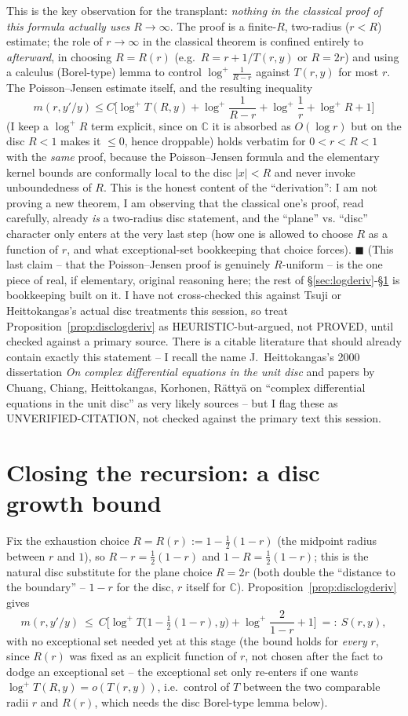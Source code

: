 \documentclass[11pt]{article}
\theoremstyle{remark}
\newcommand{\C}{\mathbb C}
\begin{document}
This is the key observation for the transplant: \emph{nothing in the classical proof of this
formula actually uses $R\to\infty$}. The proof is a finite-$R$, two-radius ($r<R$) estimate; the
role of $r\to\infty$ in the classical theorem is confined entirely to \emph{afterward}, in choosing
$R=R(r)$ (e.g.\ $R=r+1/T(r,y)$ or $R=2r$) and using a calculus (Borel-type) lemma to control
$\log^+\frac1{R-r}$ against $T(r,y)$ for most $r$. The Poisson--Jensen estimate itself, and the
resulting inequality
\[
m(r,y'/y)\le C\Big[\log^+T(R,y)+\log^+\frac1{R-r}+\log^+\frac1r+\log^+R+1\Big]
\]
(I keep a $\log^+R$ term explicit, since on $\C$ it is absorbed as $O(\log r)$ but on the disc
$R<1$ makes it $\le0$, hence droppable) holds verbatim for $0<r<R<1$ with the \emph{same} proof,
because the Poisson--Jensen formula and the elementary kernel bounds are conformally local to the
disc $|x|<R$ and never invoke unboundedness of $R$. This is the honest content of the
``derivation'': I am not proving a new theorem, I am observing that the classical
one's proof, read carefully, already \emph{is} a two-radius disc statement, and the ``plane'' vs.
``disc'' character only enters at the very last step (how one is allowed to choose $R$ as a
function of $r$, and what exceptional-set bookkeeping that choice forces). $\blacksquare$ (This
last claim -- that the Poisson--Jensen proof is genuinely $R$-uniform -- is the one piece of real,
if elementary, original reasoning here; the rest of \S\ref{sec:logderiv}-\S\ref{sec:bound} is
bookkeeping built on it. I have not cross-checked this against Tsuji or Heittokangas's actual disc
treatments this session, so treat Proposition~\ref{prop:disclogderiv} as HEURISTIC-but-argued, not
PROVED, until checked against a primary source. There is a citable literature that should already
contain exactly this statement -- I recall the name J.\ Heittokangas's 2000 dissertation
\emph{On complex differential equations in the unit disc} and papers by Chuang, Chiang,
Heittokangas, Korhonen, R\"atty\"a on ``complex differential equations in the unit disc'' as very
likely sources -- but I flag these as UNVERIFIED-CITATION, not checked against the primary text
this session.

\section{Closing the recursion: a disc growth bound}\label{sec:bound}

Fix the exhaustion choice $R=R(r):=1-\tfrac12(1-r)$ (the midpoint radius between $r$ and $1$), so
$R-r=\tfrac12(1-r)$ and $1-R=\tfrac12(1-r)$; this is the natural disc substitute for the plane
choice $R=2r$ (both double the ``distance to the boundary'' -- $1-r$ for the disc, $r$ itself for
$\C$). Proposition~\ref{prop:disclogderiv} gives
\[
m(r,y'/y)\ \le\ C\Big[\log^+T\big(1-\tfrac12(1-r),y\big)+\log^+\frac2{1-r}+1\Big]
\ =:\ S(r,y),
\]
with no exceptional set needed yet at this stage (the bound holds for \emph{every} $r$, since
$R(r)$ was fixed as an explicit function of $r$, not chosen after the fact to dodge an
exceptional set -- the exceptional set only re-enters if one wants $\log^+T(R,y)=o(T(r,y))$, i.e.\
control of $T$ between the two comparable radii $r$ and $R(r)$, which needs the disc Borel-type
lemma below).
\end{document}
